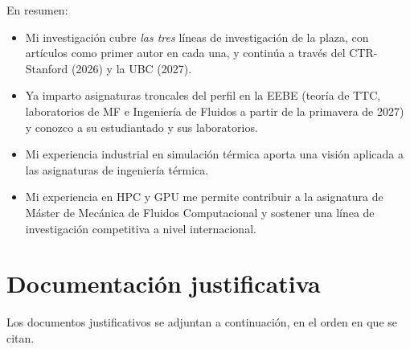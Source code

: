 \documentclass[11pt]{article}
\begin{document}
\noindent En resumen:
\begin{itemize}
\item Mi investigaci\'on cubre \emph{las tres} l\'ineas de investigaci\'on de la plaza, con
art\'iculos como primer autor en cada una, y contin\'ua a trav\'es del CTR-Stanford (2026) y
la UBC (2027).
\item Ya imparto asignaturas troncales del perfil en la EEBE (teor\'ia de TTC, laboratorios
de MF e Ingenier\'ia de Fluidos a partir de la primavera de 2027) y conozco a su
estudiantado y sus laboratorios.
\item Mi experiencia industrial en simulaci\'on t\'ermica aporta una visi\'on aplicada a las
asignaturas de ingenier\'ia t\'ermica.
\item Mi experiencia en HPC y GPU me permite contribuir a la asignatura de M\'aster de
Mec\'anica de Fluidos Computacional y sostener una l\'inea de investigaci\'on competitiva a
nivel internacional.
\end{itemize}

\newpage
\section{Documentaci\'on justificativa}
Los documentos justificativos se adjuntan a continuaci\'on, en el orden en que se citan.

\end{document}
